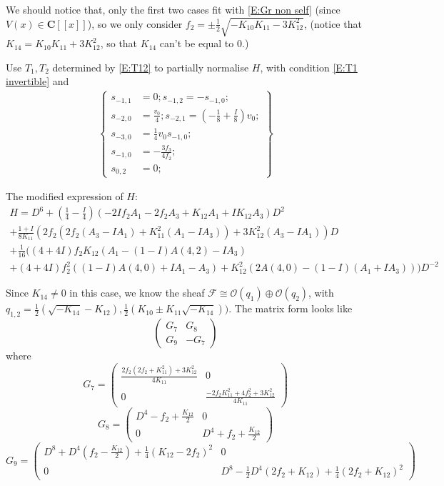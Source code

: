 \documentclass[11pt]{article}
\theoremstyle{definition}
\theoremstyle{plain}
\numberwithin{equation}{section}
\begin{document}
We should notice that, only the first two cases fit with \eqref{E:Gr non self} (since $V(x)\in \mathbf{C}[[x]]$), so we only consider $f_2=\pm\frac{1}{2} \sqrt{-K_{10} K_{11}-3K_{12}^2}$, (notice that $K_{14}=K_{10} K_{11}+3K_{12}^2$, so that $K_{14}$ can't be equal to $0$.)

Use $T_1,T_2$ determined by \eqref{E:T12} to partially normalise $H$, with condition \eqref{E:T1 invertible} and 
\begin{align}
	\label{E:Second conjugation nonself v=1}
	\left\{\begin{aligned}
		s_{-1,1}&=0;s_{-1,2}=-s_{-1,0};
		\\s_{-2,0}&=\frac{v_0}{4};s_{-2,1}=(-\frac{1}{8}+\frac{I}{8}) v_0;
		\\s_{-3,0}&=\frac{1}{4} v_0 s_{-1,0};
		\\ s_{-1,0}&=-\frac{3 f_3}{4 f_2};
		\\s_{0,2}&= 0;
		\end{aligned}\right\}
\end{align}

The modified  expression of $H$:
\begin{multline*}
	H=D^6+\left(\frac{1}{4}-\frac{I}{4}\right) (-2 I f_2 A_1-2 f_2 A_3+K_{12} A_1+I K_{12} A_3)D^2
	\\+\frac{1+I}{8 K_{11}} \left(2 f_2 \left(2 f_2 (A_3-I A_1)+K_{11}^2 (A_1-I A_3)\right)+3 K_{12}^2 (A_3-I A_1)\right)D
	\\+\frac{1}{16} \Big((4+4 I) f_2 K_{12} (A_1-(1-I) A(4,2)-I A_3)
	\\+(4+4 I) f_2^2 ((1-I) A(4,0)+I A_1-A_3)+K_{12}^2 (2 A(4,0)-(1-I) (A_1+I A_3))\Big)D^{-2}
\end{multline*}

Since $K_{14}\neq 0$ in this case, we know the sheaf $\mathcal{F}\cong \mathcal{O}(q_1)\oplus \mathcal{O}(q_2)$, with $q_{1,2}=\frac{1}{2} (\sqrt{-K_{14}}-K_{12}),\frac{1}{2} (K_{10}\pm K_{11} \sqrt{-K_{14}}))$. The matrix form looks like
$$
\begin{pmatrix}
G_7	& G_8 \\
G_9	& -G_7
\end{pmatrix}
$$
where 
$$
G_7=\begin{pmatrix}
\frac{2 f_2 \left(2 f_2+K_{11}^2\right)+3 K_{12}^2}{4 K_{11}}	& 0 \\
0	& \frac{-2 f_2 K_{11}^2+4 f_2^2+3 K_{12}^2}{4 K_{11}}
\end{pmatrix}
$$
$$
G_8=\begin{pmatrix}
D^4-f_2+\frac{K_{12}}{2}	&  0\\
0	& D^4+f_2+\frac{K_{12}}{2}
\end{pmatrix}
$$
$$
G_9=\begin{pmatrix}
D^8+D^4 \left(f_2-\frac{K_{12}}{2}\right)+\frac{1}{4} (K_{12}-2 f_2)^2	& 0 \\
0	& D^8-\frac{1}{2} D^4 (2 f_2+K_{12})+\frac{1}{4} (2 f_2+K_{12})^2
\end{pmatrix}
$$
\end{document}
